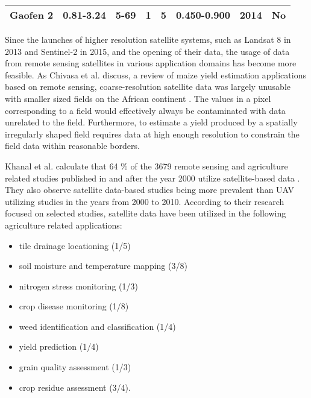 \begin{table}[htb]
\begin{tabular}{@{}llllllll@{}}
    Gaofen 2 \cite{Gaofen2}        & 0.81-3.24                                                                         & 5-69                                                                       & 1                                                                       & 5                                                                    & 0.450-0.900                                                                    & 2014                                                           & No                                                             \\ \bottomrule
    \end{tabular}
\end{table}

Since the launches of higher resolution satellite systems, such as Landsat 8 in 2013 and Sentinel-2 in 2015, and the opening of their data, the usage of data from remote sensing satellites in various application domains has become more feasible. As Chivasa et al. discuss, a review of maize yield estimation applications based on remote sensing, coarse-resolution satellite data was largely unusable with smaller sized fields on the African continent \cite{Chivasa2017}. The values in a pixel corresponding to a field would effectively always be contaminated with data unrelated to the field. Furthermore, to estimate a yield produced by a spatially irregularly shaped field requires data at high enough resolution to constrain the field data within reasonable borders.

Khanal et al. calculate that 64 \% of the 3679 remote sensing and agriculture related studies published in and after the year 2000 utilize satellite-based data \cite{Khanal2020}. They also observe satellite data-based studies being more prevalent than UAV utilizing studies in the years from 2000 to 2010. According to their research focused on selected studies, satellite data have been utilized in the following agriculture related applications:

\begin{itemize}
    \item tile drainage locationing (1/5)
    \item soil moisture and temperature mapping (3/8)
    \item nitrogen stress monitoring (1/3)
    \item crop disease monitoring (1/8)
    \item weed identification and classification (1/4)
    \item yield prediction (1/4)
    \item grain quality assessment (1/3)
    \item crop residue assessment (3/4).
\end{itemize}

